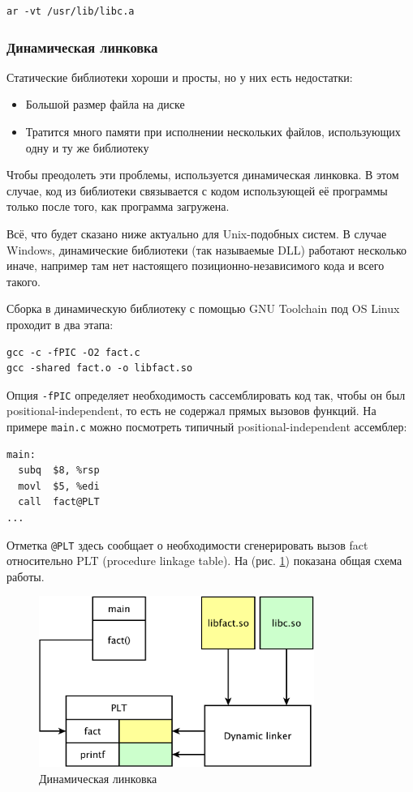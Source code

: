 \documentclass[a4paper,12pt,oneside]{article}
\begin{document}
\begin{verbatim}
ar -vt /usr/lib/libc.a
\end{verbatim}

\subsubsection{Динамическая линковка}

Статические библиотеки хороши и просты, но у них есть недостатки:

\begin{itemize}
\item Большой размер файла на диске
\item Тратится много памяти при исполнении нескольких файлов, использующих одну и ту же библиотеку
\end{itemize}

Чтобы преодолеть эти проблемы, используется динамическая линковка. В этом случае, код из библиотеки связывается с кодом использующей её программы только после того, как программа загружена. 

Всё, что будет сказано ниже актуально для Unix-подобных систем. В случае Windows, динамические библиотеки (так называемые DLL) работают несколько иначе, например там нет настоящего позиционно-независимого кода и всего такого.

Сборка в динамическую библиотеку с помощью GNU Toolchain под OS Linux проходит в два этапа:

\begin{verbatim}
gcc -c -fPIC -O2 fact.c
gcc -shared fact.o -o libfact.so
\end{verbatim}

Опция \lstinline!-fPIC! определяет необходимость сассемблировать код так, чтобы он был positional-independent, то есть не содержал прямых вызовов функций. На примере \lstinline!main.c! можно посмотреть типичный positional-independent ассемблер:

\begin{verbatim}
main:
  subq  $8, %rsp
  movl  $5, %edi
  call  fact@PLT
...
\end{verbatim}

Отметка \lstinline!@PLT! здесь сообщает о необходимости сгенерировать вызов fact относительно PLT (procedure linkage table). На (рис. \ref{fig:dl}) показана общая схема работы.

\begin{figure}[ht]
\centering
\includegraphics[width=0.8\textwidth]{illustrations/dl-scheme-crop.pdf}
\caption{Динамическая линковка}
\label{fig:dl}
\end{figure}
\end{document}
